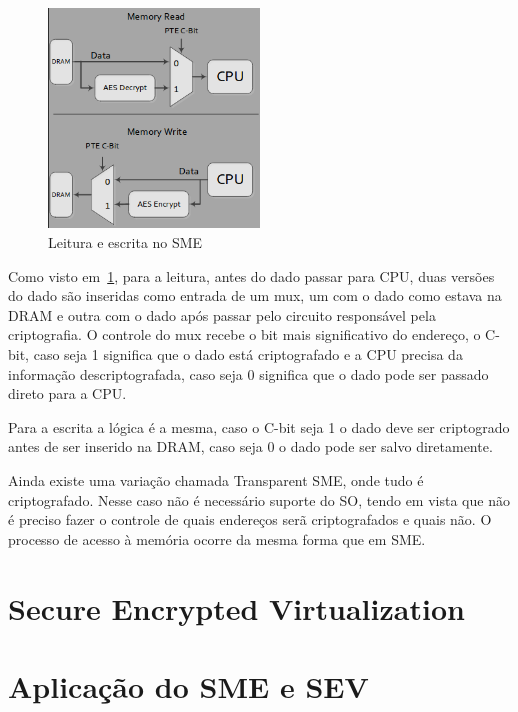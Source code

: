 \documentclass{report}
\begin{document}
\begin{figure}[h]
    \centering
    \includegraphics[width=0.5\textwidth]{img/sme_read_write_architecture}
    \caption{Leitura e escrita no SME}\label{sme-read-write}
\end{figure}

Como visto em~\ref{sme-read-write}, para a leitura, antes do dado passar para
CPU, duas versões do dado são inseridas como entrada de um mux, um com o dado
como estava na DRAM e outra com o dado após passar pelo circuito responsável
pela criptografia. O controle do mux recebe o bit mais significativo do
endereço, o C-bit, caso seja 1 significa que o dado está criptografado e a CPU
precisa da informação descriptografada, caso seja 0 significa que o dado pode
ser passado direto para a CPU\@.

Para a escrita a lógica é a mesma, caso o C-bit seja 1 o dado deve ser
criptogrado antes de ser inserido na DRAM, caso seja 0 o dado pode ser salvo
diretamente.

Ainda existe uma variação chamada Transparent SME, onde tudo é criptografado.
Nesse caso não é necessário suporte do SO, tendo em vista que não é preciso
fazer o controle de quais endereços serã criptografados e quais não. O processo
de acesso à memória ocorre da mesma forma que em SME\@.


\section{Secure Encrypted Virtualization}

\section{Aplicação do SME e SEV}

\section{}


\nocite{*}

\end{document}
